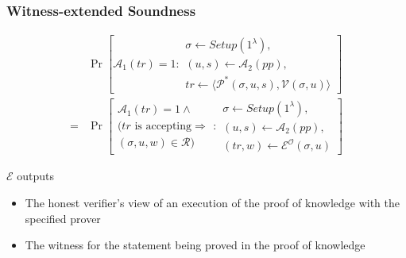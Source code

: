 \documentclass[UFT8]{beamer}
\begin{document}
\begin{frame}
    \frametitle{Witness-extended Soundness}
    \begin{definition}
        \begin{align*}
            & \Pr\left[
                \mathcal{A}_1(tr) = 1 : \begin{aligned}
                \sigma \leftarrow Setup(1^\lambda), \\
                (u, s) \leftarrow \mathcal{A}_2(pp), \\
                tr \leftarrow \langle \mathcal{P}^*(\sigma, u, s), \mathcal{V}(\sigma, u) \rangle
            \end{aligned} 
            \right] \\
            = & \Pr\left[ \begin{aligned}
                \mathcal{A}_1(tr) = 1 \land \\
                (tr \text{ is accepting} \Rightarrow \\
                (\sigma, u, w) \in \mathcal{R})
            \end{aligned}: \begin{aligned}
                \sigma \leftarrow Setup(1^\lambda), \\
                (u, s) \leftarrow \mathcal{A}_2(pp), \\
                (tr, w) \leftarrow \mathcal{E}^{\mathcal{O}}(\sigma, u)
            \end{aligned} 
            \right]
        \end{align*}
    \end{definition}
    $\mathcal{E}$ outputs
    \begin{itemize}
        \item The honest verifier's view of an execution of the proof of knowledge with the specified prover
        \item The witness for the statement being proved in the proof of knowledge
    \end{itemize}
\end{frame}
\end{document}
